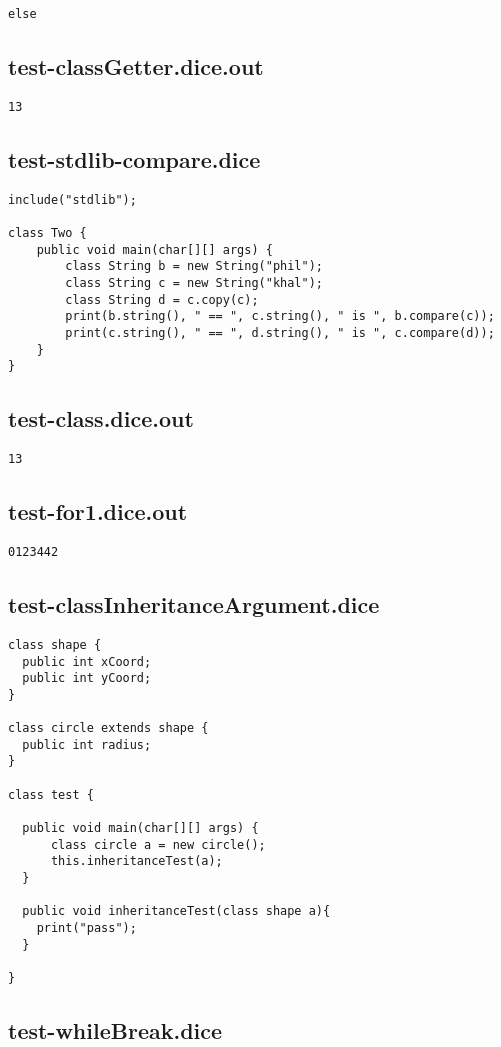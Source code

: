 \begin{verbatim}
else
\end{verbatim}\pagebreak\subsection{test-classGetter.dice.out}
\begin{verbatim}
13
\end{verbatim}\pagebreak\subsection{test-stdlib-compare.dice}
\begin{verbatim}
include("stdlib");

class Two {
	public void main(char[][] args) {
        class String b = new String("phil");
        class String c = new String("khal");
        class String d = c.copy(c);
        print(b.string(), " == ", c.string(), " is ", b.compare(c));
        print(c.string(), " == ", d.string(), " is ", c.compare(d));
	}
}

\end{verbatim}\pagebreak\subsection{test-class.dice.out}
\begin{verbatim}
13
\end{verbatim}\pagebreak\subsection{test-for1.dice.out}
\begin{verbatim}
0123442
\end{verbatim}\pagebreak\subsection{test-classInheritanceArgument.dice}
\begin{verbatim}
class shape {
  public int xCoord;
  public int yCoord;
}

class circle extends shape {
  public int radius;
}

class test {

  public void main(char[][] args) {
      class circle a = new circle(); 
      this.inheritanceTest(a);
  }

  public void inheritanceTest(class shape a){
    print("pass");
  }

}
\end{verbatim}\pagebreak\subsection{test-whileBreak.dice}

